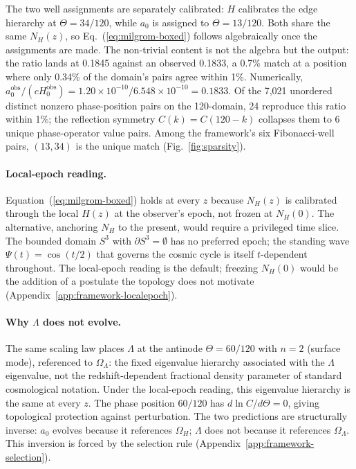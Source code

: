 \documentclass[
    aps,
    prd,
    reprint,
    superscriptaddress,
    nofootinbib,
    floatfix
]{revtex4-2}
\begin{document}
The two well assignments are separately calibrated: $H$ calibrates the
edge hierarchy at $\Theta = 34/120$, while $a_0$ is assigned to
$\Theta = 13/120$. Both share the same $N_H(z)$, so
Eq.~(\ref{eq:milgrom-boxed}) follows algebraically once the
assignments are made. The non-trivial content is not the algebra but
the output: the ratio lands at 0.1845 against an observed 0.1833, a
0.7\% match at a position where only 0.34\% of the domain's pairs
agree within 1\%. Numerically,
$a_0^{\text{obs}}/(cH_0^{\text{obs}}) =
1.20 \times 10^{-10} / 6.548 \times 10^{-10} = 0.1833$. Of the 7,021
unordered distinct nonzero phase-position pairs on the 120-domain, 24
reproduce this ratio within 1\%; the reflection symmetry
$C(k) = C(120-k)$ collapses them to 6 unique phase-operator value
pairs. Among the framework's six Fibonacci-well pairs, $(13, 34)$ is
the unique match (Fig.~\ref{fig:sparsity}).

\paragraph*{Local-epoch reading.}
Equation~(\ref{eq:milgrom-boxed}) holds at every $z$ because $N_H(z)$
is calibrated through the local $H(z)$ at the observer's epoch, not
frozen at $N_H(0)$. The alternative, anchoring $N_H$ to the present,
would require a privileged time slice. The bounded domain $S^3$ with
$\partial S^3 = \emptyset$ has no preferred epoch; the standing wave
$\Psi(t) = \cos(t/2)$ that governs the cosmic cycle is itself
$t$-dependent throughout. The local-epoch reading is the default;
freezing $N_H(0)$ would be the addition of a postulate the topology
does not motivate (Appendix~\ref{app:framework-localepoch}).

\paragraph*{Why $\Lambda$ does not evolve.}
The same scaling law places $\Lambda$ at the antinode
$\Theta = 60/120$ with $n = 2$ (surface mode), referenced to
$\Omega_\Lambda$: the fixed eigenvalue hierarchy associated with the
$\Lambda$ eigenvalue, not the redshift-dependent fractional density
parameter of standard cosmological notation. Under the local-epoch
reading, this eigenvalue hierarchy is the same at every $z$. The phase
position $60/120$ has $d\ln C/d\Theta = 0$, giving topological
protection against perturbation. The two predictions are structurally
inverse: $a_0$ evolves because it references $\Omega_H$; $\Lambda$
does not because it references $\Omega_\Lambda$. This inversion is
forced by the selection rule
(Appendix~\ref{app:framework-selection}).
\end{document}
